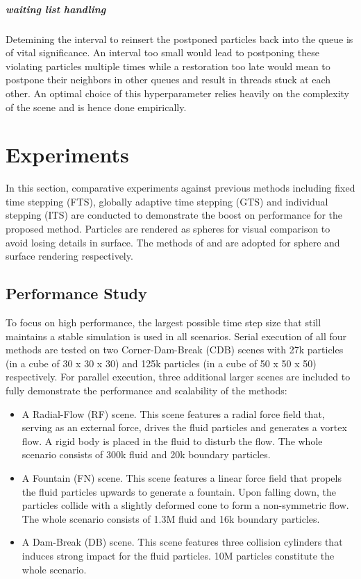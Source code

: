 \documentclass[
	11pt, 
	DIV10,
	ngerman,
	a4paper, 
	oneside, 
	headings=normal, 
	captions=tableheading,
	final, 
	numbers=noenddot
]{scrartcl}
\begin{document}
\subparagraph{waiting list handling}
Detemining the interval to reinsert the postponed particles back into the queue is of vital significance. An interval too small would lead to postponing these violating particles multiple times while a restoration too late would mean to postpone their neighbors in other queues and result in threads stuck at each other. An optimal choice of this hyperparameter relies heavily on the complexity of the scene and is hence done empirically.

\section{Experiments}
In this section, comparative experiments against previous methods including fixed time stepping (FTS), globally adaptive time stepping (GTS) \cite{desbrun1996smoothed} and individual stepping (ITS) \cite{ban2018adaptively} are conducted to demonstrate the boost on performance for the proposed method. Particles are rendered as spheres for visual comparison to avoid losing details in surface. The methods of \cite{reinhardt2017visual} and \cite{bhatacharya2011level} are adopted for sphere and surface rendering respectively.

\subsection{Performance Study}
To focus on high performance, the largest possible time step size that still maintains a stable simulation is used in all scenarios. Serial execution of all four methods are tested on two Corner-Dam-Break (CDB) scenes with 27k particles (in a cube of 30 x 30 x 30) and 125k particles (in a cube of 50 x 50 x 50) respectively. For parallel execution, three additional larger scenes are included to fully demonstrate the performance and scalability of the methods:

\begin{itemize}
    \item A Radial-Flow (RF) scene. This scene features a radial force field that, serving as an external force, drives the fluid particles and generates a vortex flow. A rigid body is placed in the fluid to disturb the flow. The whole scenario consists of 300k fluid and 20k boundary particles.
    \item A Fountain (FN) scene. This scene features a linear force field that propels the fluid particles upwards to generate a fountain. Upon falling down, the particles collide with a slightly deformed cone to form a non-symmetric flow. The whole scenario consists of 1.3M fluid and 16k boundary particles.
    \item A Dam-Break (DB) scene. This scene features three collision cylinders that induces strong impact for the fluid particles. 10M particles constitute the whole scenario.
\end{itemize}
\end{document}
